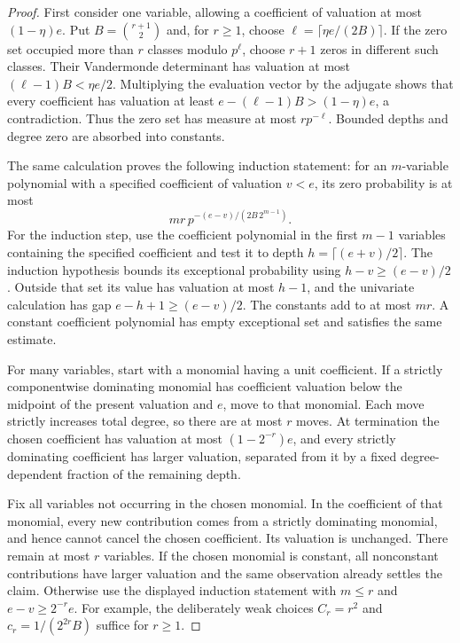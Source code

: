 \begin{proof}
First consider one variable, allowing a coefficient of valuation at
most $(1-\eta)e$.  Put $B=\binom{r+1}{2}$ and, for $r\ge1$, choose
$\ell=\lceil\eta e/(2B)\rceil$.  If the zero set occupied more than
$r$ classes modulo $p^\ell$, choose $r+1$ zeros in different such
classes.  Their Vandermonde determinant has valuation at most
$(\ell-1)B<\eta e/2$.  Multiplying the evaluation vector by the
adjugate shows that every coefficient has valuation at least
$e-(\ell-1)B>(1-\eta)e$, a contradiction.  Thus the zero set has
measure at most $r p^{-\ell}$.  Bounded depths and degree zero are
absorbed into constants.

The same calculation proves the following induction statement: for
an $m$-variable polynomial with a specified coefficient of valuation
$v<e$, its zero probability is at most
\[
                   mr\,p^{-(e-v)/(2B\,2^{m-1})}.
\]
For the induction step, use the coefficient polynomial in the first
$m-1$ variables containing the specified coefficient and test it
to depth $h=\lceil(e+v)/2\rceil$.  The induction hypothesis bounds
its exceptional probability using $h-v\ge(e-v)/2$.  Outside that
set its value has valuation at most $h-1$, and the univariate
calculation has gap $e-h+1\ge(e-v)/2$.  The constants add to at
most $mr$.  A constant coefficient polynomial has empty exceptional
set and satisfies the same estimate.

For many variables, start with a monomial having a unit coefficient.
If a strictly componentwise dominating monomial has coefficient
valuation below the midpoint of the present valuation and $e$, move
to that monomial.  Each move strictly increases total degree, so
there are at most $r$ moves.  At termination the chosen coefficient
has valuation at most $(1-2^{-r})e$, and every strictly dominating
coefficient has larger valuation, separated from it by a fixed
degree-dependent fraction of the remaining depth.

Fix all variables not occurring in the chosen monomial.  In the
coefficient of that monomial, every new contribution comes from a
strictly dominating monomial, and hence cannot cancel the chosen
coefficient.  Its valuation is unchanged.  There remain at most
$r$ variables.  If the chosen monomial is constant, all nonconstant
contributions have larger valuation and the same observation already
settles the claim.  Otherwise use the displayed induction statement
with $m\le r$ and $e-v\ge2^{-r}e$.  For example, the deliberately
weak choices $C_r=r^2$ and $c_r=1/(2^{2r}B)$ suffice for $r\ge1$.
\end{proof}


